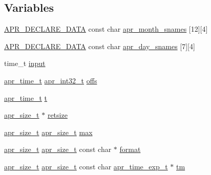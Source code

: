 \subsection*{Variables}
\begin{DoxyCompactItemize}
\item 
\hyperlink{group__apr__platform_ga16a1a3d65c57ce052fffb63190b1cadc}{A\+P\+R\+\_\+\+D\+E\+C\+L\+A\+R\+E\+\_\+\+D\+A\+TA} const char \hyperlink{group__apr__time_ga4307e6d6e3a6e60af902edc4743723ee}{apr\+\_\+month\+\_\+snames} \mbox{[}12\mbox{]}\mbox{[}4\mbox{]}
\item 
\hyperlink{group__apr__platform_ga16a1a3d65c57ce052fffb63190b1cadc}{A\+P\+R\+\_\+\+D\+E\+C\+L\+A\+R\+E\+\_\+\+D\+A\+TA} const char \hyperlink{group__apr__time_ga7deb42a36f677bf27da84151f7df74dc}{apr\+\_\+day\+\_\+snames} \mbox{[}7\mbox{]}\mbox{[}4\mbox{]}
\item 
time\+\_\+t \hyperlink{group__apr__time_gaca34a9326ce6f26f5d16d40a11515925}{input}
\item 
\hyperlink{group__apr__time_gadb4bde16055748190eae190c55aa02bb}{apr\+\_\+time\+\_\+t} \hyperlink{group__apr__platform_ga21ef1e35fd3ff9be386f3cb20164ff02}{apr\+\_\+int32\+\_\+t} \hyperlink{group__apr__time_ga9bcfe551980c06f6cc21a62387c90920}{offs}
\item 
\hyperlink{group__apr__time_gadb4bde16055748190eae190c55aa02bb}{apr\+\_\+time\+\_\+t} \hyperlink{group__apr__time_gabfa74bb4f05f3b2de1a89160025e5400}{t}
\item 
\hyperlink{group__apr__platform_gaaa72b2253f6f3032cefea5712a27540e}{apr\+\_\+size\+\_\+t} $\ast$ \hyperlink{group__apr__time_gad002c9861f62c612b3224a3b98253b31}{retsize}
\item 
\hyperlink{group__apr__platform_gaaa72b2253f6f3032cefea5712a27540e}{apr\+\_\+size\+\_\+t} \hyperlink{group__apr__platform_gaaa72b2253f6f3032cefea5712a27540e}{apr\+\_\+size\+\_\+t} \hyperlink{group__apr__time_gabd53dba8aa2b6aef034e67569fedebfc}{max}
\item 
\hyperlink{group__apr__platform_gaaa72b2253f6f3032cefea5712a27540e}{apr\+\_\+size\+\_\+t} \hyperlink{group__apr__platform_gaaa72b2253f6f3032cefea5712a27540e}{apr\+\_\+size\+\_\+t} const char $\ast$ \hyperlink{group__apr__time_ga6427c3237144d9709aa13825289f0b78}{format}
\item 
\hyperlink{group__apr__platform_gaaa72b2253f6f3032cefea5712a27540e}{apr\+\_\+size\+\_\+t} \hyperlink{group__apr__platform_gaaa72b2253f6f3032cefea5712a27540e}{apr\+\_\+size\+\_\+t} const char \hyperlink{structapr__time__exp__t}{apr\+\_\+time\+\_\+exp\+\_\+t} $\ast$ \hyperlink{group__apr__time_ga3ea988e6273ca725c8210dcfdc48402f}{tm}
\end{DoxyCompactItemize}


